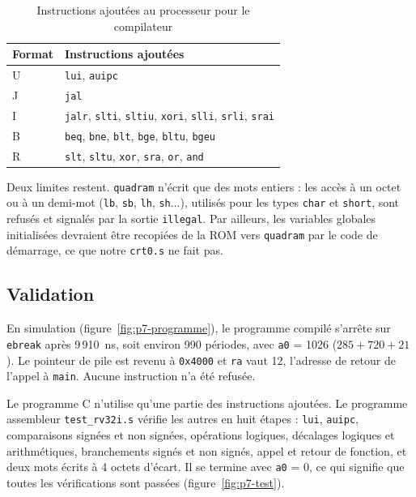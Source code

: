 \begin{table}[H]
\centering
\begin{tabular}{ll}
\toprule
Format & Instructions ajoutées \\
\midrule
U & \texttt{lui}, \texttt{auipc} \\
J & \texttt{jal} \\
I & \texttt{jalr}, \texttt{slti}, \texttt{sltiu}, \texttt{xori}, \texttt{slli}, \texttt{srli}, \texttt{srai} \\
B & \texttt{beq}, \texttt{bne}, \texttt{blt}, \texttt{bge}, \texttt{bltu}, \texttt{bgeu} \\
R & \texttt{slt}, \texttt{sltu}, \texttt{xor}, \texttt{sra}, \texttt{or}, \texttt{and} \\
\bottomrule
\end{tabular}
\caption{Instructions ajoutées au processeur pour le compilateur}
\label{tab:rv32i-ajout}
\end{table}

Deux limites restent. \texttt{quadram} n'écrit que des mots entiers : les accès à un octet
ou à un demi-mot (\texttt{lb}, \texttt{sb}, \texttt{lh}, \texttt{sh}...), utilisés pour les
types \texttt{char} et \texttt{short}, sont refusés et signalés par la sortie
\texttt{illegal}. Par ailleurs, les variables globales initialisées devraient être recopiées
de la ROM vers \texttt{quadram} par le code de démarrage, ce que notre \texttt{crt0.s} ne
fait pas.

\subsection{Validation}

En simulation (figure~\ref{fig:p7-programme}), le programme compilé s'arrête sur
\texttt{ebreak} après 9\,910~ns, soit environ 990 périodes, avec \texttt{a0} = 1026
($285 + 720 + 21$). Le pointeur de pile est revenu à \texttt{0x4000} et \texttt{ra} vaut 12,
l'adresse de retour de l'appel à \texttt{main}. Aucune instruction n'a été refusée.

Le programme C n'utilise qu'une partie des instructions ajoutées. Le programme assembleur
\texttt{test\_rv32i.s} vérifie les autres en huit étapes : \texttt{lui}, \texttt{auipc},
comparaisons signées et non signées, opérations logiques, décalages logiques et
arithmétiques, branchements signés et non signés, appel et retour de fonction, et deux mots
écrits à 4 octets d'écart. Il se termine avec \texttt{a0} = 0, ce qui signifie que toutes
les vérifications sont passées (figure~\ref{fig:p7-test}).

